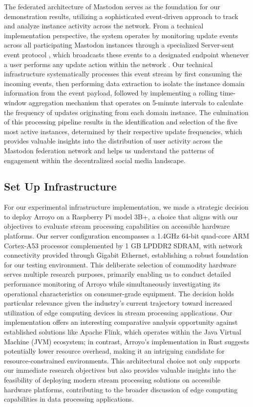 The federated architecture of Mastodon serves as the foundation for our demonstration results,
utilizing a sophisticated event-driven approach to track and analyze instance activity across the
network. From a technical implementation perspective, the system operates by monitoring update
events across all participating Mastodon instances through a specialized Server-sent event
protocol \cite{html_standard_2024}, which broadcasts these events to a designated endpoint whenever a
user performs any update action within the network \cite{mastodon_ggmbh_2022}. Our technical
infrastructure systematically processes this event stream by first consuming the incoming events,
then performing data extraction to isolate the instance domain information from the event payload,
followed by implementing a rolling time-window aggregation mechanism that operates on 5-minute
intervals to calculate the frequency of updates originating from each domain instance. The
culmination of this processing pipeline results in the identification and selection of the five most
active instances, determined by their respective update frequencies, which provides valuable
insights into the distribution of user activity across the Mastodon federation network and helps us
understand the patterns of engagement within the decentralized social media landscape.

\subsection{Set Up Infrastructure}
For our experimental infrastructure implementation, we made a strategic decision to deploy Arroyo on
a Raspberry Pi model 3B+, a choice that aligns with our objectives to evaluate stream processing
capabilities on accessible hardware platforms. Our server configuration encompasses a 1.4GHz 64-bit
quad-core ARM Cortex-A53 processor complemented by 1 GB LPDDR2 SDRAM, with network connectivity
provided through Gigabit Ethernet, establishing a robust foundation for our testing environment.
This deliberate selection of commodity hardware serves multiple research purposes, primarily
enabling us to conduct detailed performance monitoring of Arroyo while simultaneously investigating
its operational characteristics on consumer-grade equipment. The decision holds particular relevance
given the industry's current trajectory toward increased utilization of edge computing devices in
stream processing applications. Our implementation offers an interesting comparative analysis
opportunity against established solutions like Apache Flink, which operates within the Java Virtual
Machine (JVM) ecosystem; in contrast, Arroyo's implementation in Rust suggests potentially lower
resource overhead, making it an intriguing candidate for resource-constrained environments. This
architectural choice not only supports our immediate research objectives but also provides valuable
insights into the feasibility of deploying modern stream processing solutions on accessible hardware
platforms, contributing to the broader discussion of edge computing capabilities in data processing
applications.

